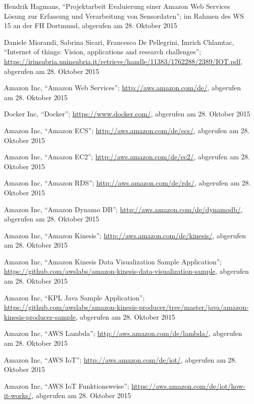 \begin{thebibliography}{1}


Hendrik Hagmans, ``Projektarbeit Evaluierung einer Amazon Web Services Lösung zur Erfassung und Verarbeitung von Sensordaten''; im Rahmen des WS 15 an der FH Dortmund, abgerufen am 28. Oktober 2015

Daniele Miorandi, Sabrina Sicari, Francesco De Pellegrini, Imrich Chlamtac, ``Internet of things: Vision, applications and research challenges''; \url{https://irinsubria.uninsubria.it/retrieve/handle/11383/1762288/2389/IOT.pdf}, abgerufen am 28. Oktober 2015

Amazon Inc, ``Amazon Web Services''; \url{http://aws.amazon.com/de/}, abgerufen am 28. Oktober 2015

Docker Inc, ``Docker''; \url{https://www.docker.com/}, abgerufen am 28. Oktober 2015

Amazon Inc, ``Amazon ECS''; \url{http://aws.amazon.com/de/ecs/}, abgerufen am 28. Oktober 2015

Amazon Inc, ``Amazon EC2''; \url{http://aws.amazon.com/de/ec2/}, abgerufen am 28. Oktober 2015

Amazon Inc, ``Amazon RDS''; \url{http://aws.amazon.com/de/rds/}, abgerufen am 28.
Oktober 2015

Amazon Inc, ``Amazon Dynamo DB''; \url{http://aws.amazon.com/de/dynamodb/}, abgerufen am 28. Oktober 2015

Amazon Inc, ``Amazon Kinesis''; \url{http://aws.amazon.com/de/kinesis/}, abgerufen am 28. Oktober 2015

Amazon Inc, ``Amazon Kinesis Data Visualization Sample Application''; \url{https://github.com/awslabs/amazon-kinesis-data-visualization-sample}, abgerufen am 28. Oktober 2015

Amazon Inc, ``KPL Java Sample Application''; \url{https://github.com/awslabs/amazon-kinesis-producer/tree/master/java/amazon-kinesis-producer-sample}, abgerufen am 28. Oktober 2015

Amazon Inc, ``AWS Lambda''; \url{http://aws.amazon.com/de/lambda/}, abgerufen am 28. Oktober 2015

Amazon Inc, ``AWS IoT''; \url{http://aws.amazon.com/de/iot/}, abgerufen am 28. Oktober 2015


Amazon Inc, ``AWS IoT Funktionsweise''; \url{https://aws.amazon.com/de/iot/how-it-works/}, abgerufen am 28. Oktober 2015


\end{thebibliography}

